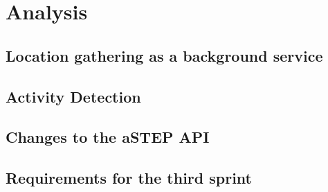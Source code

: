 \section{Analysis}

\subsection{Location gathering as a background service} \label{ssec:LocationGatherBGS}


\subsection{Activity Detection}


\subsection{Changes to the aSTEP API}


\subsection{Requirements for the third sprint}

